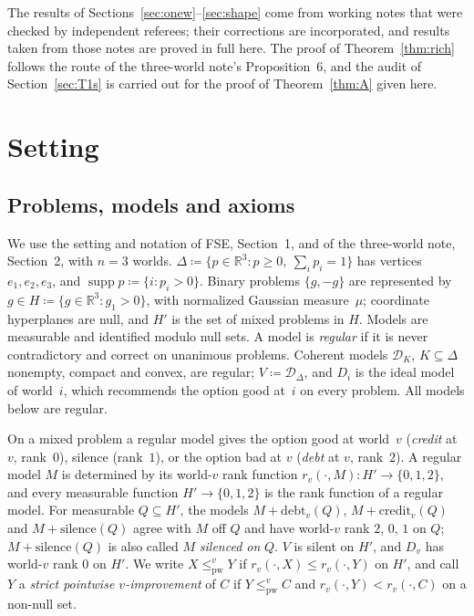 \documentclass[11pt]{article}
\theoremstyle{definition}\newtheorem{definition}[theorem]{Definition}
\theoremstyle{remark}\newtheorem{remark}[theorem]{Remark}
\newcommand{\R}{\mathbb R}
\newcommand{\Dscr}{\mathcal D}
\newcommand{\supp}{\operatorname{supp}}
\newcommand{\debt}{\mathrm{debt}}
\newcommand{\cred}{\mathrm{credit}}
\newcommand{\sil}{\mathrm{silence}}
\newcommand{\pw}{\mathrm{pw}}
\begin{document}
The results of Sections~\ref{sec:onew}--\ref{sec:shape} come from working
notes that were checked by independent referees; their corrections are
incorporated, and results taken from those notes are proved in full here.
The proof of Theorem~\ref{thm:rich} follows the route of the three-world
note's Proposition~6, and the audit of Section~\ref{sec:T1s} is carried out
for the proof of Theorem~\ref{thm:A} given here.

\section{Setting}\label{sec:setting}

\subsection{Problems, models and axioms}\label{sec:axioms}

We use the setting and notation of FSE, Section~1, and of the three-world
note, Section~2, with $n=3$ worlds. $\Delta\coloneqq\{p\in\R^3:p\ge0,\
\sum_ip_i=1\}$ has vertices $e_1,e_2,e_3$, and $\supp p\coloneqq
\{i:p_i>0\}$. Binary problems $\{g,-g\}$ are represented by $g\in
H\coloneqq\{g\in\R^3:g_1>0\}$, with normalized Gaussian measure~$\mu$;
coordinate hyperplanes are null, and $H'$ is the set of mixed problems in
$H$. Models are measurable and identified modulo null sets. A model is
\emph{regular} if it is never contradictory and correct on unanimous
problems. Coherent models $\Dscr_K$, $K\subseteq\Delta$ nonempty, compact
and convex, are regular; $V\coloneqq\Dscr_\Delta$, and $D_i$ is the ideal
model of world~$i$, which recommends the option good at~$i$ on every
problem. All models below are regular.

On a mixed problem a regular model gives the option good at world~$v$
(\emph{credit} at $v$, rank~$0$), silence (rank~$1$), or the option bad at
$v$ (\emph{debt} at $v$, rank~$2$). A regular model $M$ is determined by its
world-$v$ rank function $r_v(\cdot,M)\colon H'\to\{0,1,2\}$, and every
measurable function $H'\to\{0,1,2\}$ is the rank function of a regular
model. For measurable $Q\subseteq H'$, the models $M+\debt_v(Q)$,
$M+\cred_v(Q)$ and $M+\sil(Q)$ agree with $M$ off $Q$ and have world-$v$
rank $2$, $0$, $1$ on $Q$; $M+\sil(Q)$ is also called $M$ \emph{silenced on}
$Q$. $V$ is silent on $H'$, and $D_v$ has world-$v$ rank $0$ on $H'$. We
write $X\le^v_\pw Y$ if $r_v(\cdot,X)\le r_v(\cdot,Y)$ on $H'$, and call $Y$
a \emph{strict pointwise $v$-improvement} of $C$ if $Y\le^v_\pw C$ and
$r_v(\cdot,Y)<r_v(\cdot,C)$ on a non-null set.
\end{document}
